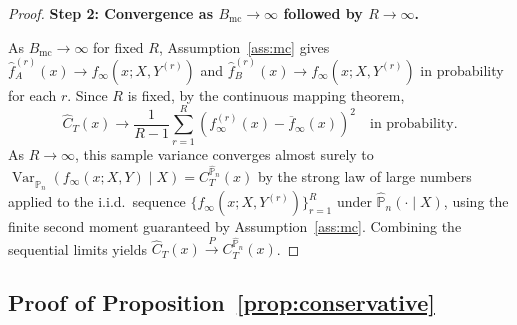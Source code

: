 \documentclass[11pt]{article}
\theoremstyle{plain}
\theoremstyle{definition}
\theoremstyle{remark}
\DeclareMathOperator{\Var}{Var}
\begin{document}
\begin{proof}
	\medskip
	\noindent\textbf{Step 2: Convergence as $B_{\mathrm{mc}}\to\infty$ followed 
		by $R\to\infty$.}
	
	As $B_{\mathrm{mc}}\to\infty$ for fixed $R$, Assumption~\ref{ass:mc} gives $\widehat f_A^{(r)}(x)\to f_\infty(x;X,Y^{(r)})$ and $\widehat f_B^{(r)}(x)\to f_\infty(x;X,Y^{(r)})$ in probability for each $r$. Since $R$ is fixed, by the continuous mapping theorem,
	\[
	\widehat C_T(x)
	\longrightarrow
	\frac{1}{R-1}\sum_{r=1}^R
	\left(f_\infty^{(r)}(x) - \overline f_\infty(x)\right)^2
	\quad\text{in probability}.
	\]
	As $R\to\infty$, this sample variance converges almost surely to $\Var_{\widehat{\mathbb P}_n}(f_\infty(x;X,Y)\mid X) = C_T^{\widehat{\mathbb P}_n}(x)$ by the strong law of large numbers applied to the i.i.d.\ sequence $\{f_\infty(x;X,Y^{(r)})\}_{r=1}^R$ under $\widehat{\mathbb P}_n(\cdot\mid X)$, using the finite second moment guaranteed by Assumption~\ref{ass:mc}. Combining the sequential limits yields 
	$\widehat C_T(x)\xrightarrow{P} C_T^{\widehat{\mathbb P}_n}(x)$.
\end{proof}


\subsection{Proof of Proposition~\ref{prop:conservative}}
\label{app:conservative}
\end{document}
